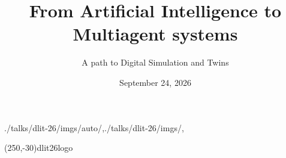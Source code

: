

\date{September 24, 2026}

\title{From Artificial Intelligence to Multiagent systems}
\subtitle{A path to Digital Simulation and Twins}


\usefootlinewithsections

\begin{graphicspathcontext}{{./talks/dlit-26/imgs/auto/},{./talks/dlit-26/imgs/},\old}

	\settitlepagerightfigure(250,-30){dlit26logo}


\end{graphicspathcontext}





\OECDAItrue
\EUAIActfalse

\endinput
